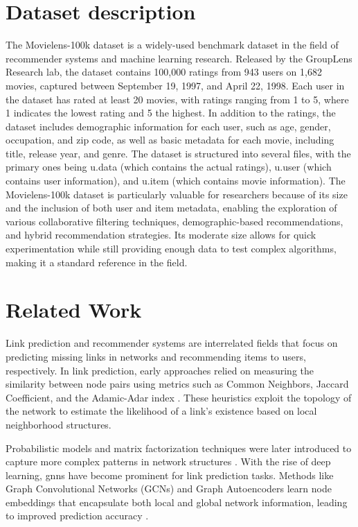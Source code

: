 \documentclass[11pt]{article}
\begin{document}
\section{Dataset description}\label{sec:dataset-description}
The Movielens-100k dataset \cite{harper2015movielens} is a widely-used benchmark dataset in the field of recommender systems and machine learning research. 
Released by the GroupLens Research lab, the dataset contains 100,000 ratings from 943 users on 1,682 movies, 
captured between September 19, 1997, and April 22, 1998. 
Each user in the dataset has rated at least 20 movies, with ratings ranging from 1 to 5, where 1 indicates the lowest rating and 5 the highest.
In addition to the ratings, the dataset includes demographic information for each user, 
such as age, gender, occupation, and zip code, as well as basic metadata for each movie, including title, release year, and genre. 
The dataset is structured into several files, with the primary ones being u.data (which contains the actual ratings), 
u.user (which contains user information), and u.item (which contains movie information).
The Movielens-100k dataset is particularly valuable for researchers because of its size and the inclusion of both user and item metadata, 
enabling the exploration of various collaborative filtering techniques, 
demographic-based recommendations, and hybrid recommendation strategies. 
Its moderate size allows for quick experimentation while still providing enough data to test complex algorithms, 
making it a standard reference in the field.

\section{Related Work}\label{sec:related-work}

Link prediction and recommender systems are interrelated fields that focus on predicting missing links in networks 
and recommending items to users, respectively. In link prediction, early approaches relied on measuring the similarity 
between node pairs using metrics such as Common Neighbors, Jaccard Coefficient, and the Adamic-Adar index 
\cite{liben2003link}. These heuristics exploit the topology of the network to estimate the likelihood 
of a link's existence based on local neighborhood structures.

Probabilistic models and matrix factorization techniques were later introduced to capture more complex 
patterns in network structures \cite{koren2009matrix}. With the rise of deep learning, \acp{gnn} have become 
prominent for link prediction tasks. Methods like Graph Convolutional Networks (GCNs) and 
Graph Autoencoders learn node embeddings that encapsulate both local and global network information, 
leading to improved prediction accuracy \cite{kipf2016semi}.
\end{document}
